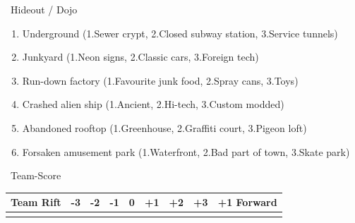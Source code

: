 \Large{}~Hideout / Dojo
\normalfont\large
\vspace{-6pt}
\begin{enumerate}
    \setlength\itemsep{-0.5em}
    \item Underground (1.Sewer crypt, 2.Closed subway station, 3.Service tunnels)
    \item Junkyard (1.Neon signs, 2.Classic cars, 3.Foreign tech)
    \item Run-down factory (1.Favourite junk food, 2.Spray cans, 3.Toys)
    \item Crashed alien ship (1.Ancient, 2.Hi-tech, 3.Custom modded)
    \item Abandoned rooftop (1.Greenhouse, 2.Graffiti court, 3.Pigeon loft)
    \item Forsaken amusement park (1.Waterfront, 2.Bad part of town, 3.Skate park)
\end{enumerate}

\vspace{0.5cm}

\Large{}~Team-Score \hspace{0.5cm}
\normalfont\large
\begin{tabular}{|r|c|c|c|c|c|c|c|c|}
    \hline
    Team Rift & -3 & -2 & -1 & 0 & +1 & +2 & +3 & +1 Forward \\
    \hline
    &&&&&&&&\\
    \hline
\end{tabular}
\hspace{0.5cm}\Large\faPizzaSlice